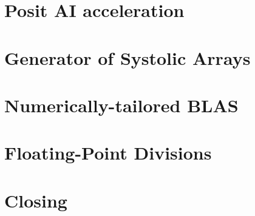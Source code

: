 \documentclass[]{beamer}
\begin{document}
\section{Posit AI acceleration}
\section{Generator of Systolic Arrays}
\section{Numerically-tailored BLAS}
\section{Floating-Point Divisions}
\section{Closing}

\appendix



 
\end{document}
